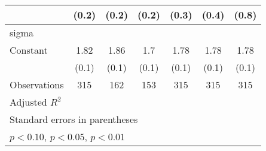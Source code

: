 \begin{table}[H]
\begin{tabular}{l*{6}{c}}
                &    (0.2)         &    (0.2)         &    (0.2)         &    (0.3)         &    (0.4)         &    (0.8)         \\
\hline
sigma           &                  &                  &                  &                  &                  &                  \\
Constant        &     1.82\sym{***}&     1.86\sym{***}&      1.7\sym{***}&     1.78\sym{***}&     1.78\sym{***}&     1.78\sym{***}\\
                &    (0.1)         &    (0.1)         &    (0.1)         &    (0.1)         &    (0.1)         &    (0.1)         \\
\hline
Observations    &      315         &      162         &      153         &      315         &      315         &      315         \\
Adjusted \(R^{2}\)&                  &                  &                  &                  &                  &                  \\
\hline\hline
\multicolumn{7}{l}{\footnotesize Standard errors in parentheses}\\
\multicolumn{7}{l}{\footnotesize \sym{*} \(p<0.10\), \sym{**} \(p<0.05\), \sym{***} \(p<0.01\)}\\
\end{tabular}
\end{table}
